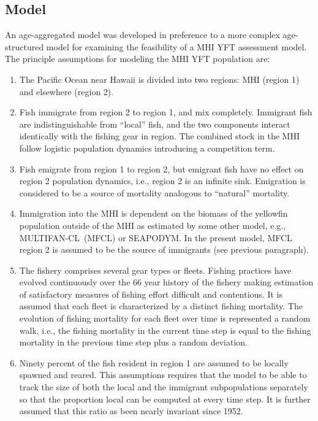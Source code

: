 \documentclass[12pt,letterpaper,twoside]{article}
\newcommand\SD{SEAPODYM}
\newcommand\MFCL{MULTIFAN-CL}
\begin{document}
\subsection{Model}
An age-aggregated model was developed in preference to a more complex
age-structured model for examining the feasibility of a MHI YFT
assessment model.
The principle assumptions for modeling the MHI YFT population are:
\begin{enumerate}
\item The Pacific Ocean near Hawaii is divided into two regions:
MHI (region 1) and elsewhere (region 2).
\item Fish immigrate from region 2 to region 1, and mix completely.
Immigrant fish are indistinguishable from ``local'' fish,
and the two components interact identically with the fishing gear in
region. The combined stock in the MHI follow logistic population
dynamics introducing a competition term.
\item Fish emigrate from region 1 to region 2, but emigrant fish have
no effect on region 2 population dynamics, i.e., region 2 is an infinite
sink. Emigration is considered to be a source of mortality analogous
to ``natural'' mortality.
\item Immigration into the MHI is dependent on the
biomass of the yellowfin population outside of the MHI as estimated by
some other model, e.g., \MFCL\ (MFCL) or \SD. In the present model,
MFCL region 2 is assumed to be the source of immigrants (see previous
paragraph).
\item The fishery comprises several gear types or fleets. Fishing
practices have evolved continuously over the 66 year history of the
fishery making estimation of satisfactory measures of fishing effort
difficult and contentious. It is assumed that each fleet is
characterized by a distinct fishing mortality.
The evolution of fishing mortality for each fleet over time is represented a 
random walk,
i.e., the fishing mortality in the current time step is equal
to the fishing mortality in the previous time step plus a random
deviation.
\item Ninety percent of the fish resident in region 1 are assumed to
be locally spawned and reared. 
This assumptions requires that the model to be able to track
the size of both the local and the immigrant subpopulations separately so
that the proportion local can be computed at every time step. It is
further assumed that this ratio as been nearly invariant since 1952.
\end{enumerate}
\end{document}
